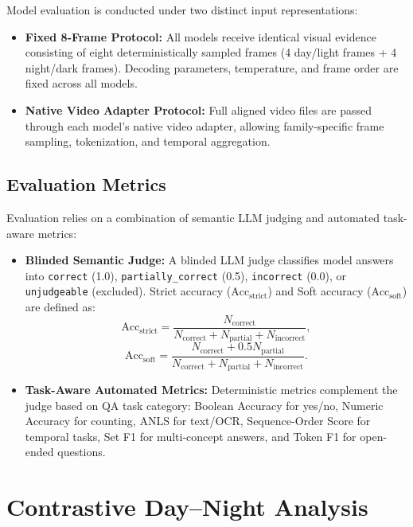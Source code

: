 Model evaluation is conducted under two distinct input representations:
\begin{itemize}
    \item \textbf{Fixed 8-Frame Protocol:} All models receive identical visual evidence consisting of eight deterministically sampled frames (4 day/light frames + 4 night/dark frames). Decoding parameters, temperature, and frame order are fixed across all models.
    \item \textbf{Native Video Adapter Protocol:} Full aligned video files are passed through each model's native video adapter, allowing family-specific frame sampling, tokenization, and temporal aggregation.
\end{itemize}

\subsection{Evaluation Metrics}

Evaluation relies on a combination of semantic LLM judging and automated task-aware metrics:
\begin{itemize}
    \item \textbf{Blinded Semantic Judge:} A blinded LLM judge classifies model answers into \texttt{correct} (1.0), \texttt{partially\_correct} (0.5), \texttt{incorrect} (0.0), or \texttt{unjudgeable} (excluded). Strict accuracy ($\mathrm{Acc}_{\mathrm{strict}}$) and Soft accuracy ($\mathrm{Acc}_{\mathrm{soft}}$) are defined as:
          \begin{equation}
              \mathrm{Acc}_{\mathrm{strict}} = \frac{N_{\mathrm{correct}}}{N_{\mathrm{correct}} + N_{\mathrm{partial}} + N_{\mathrm{incorrect}}},
          \end{equation}
          \begin{equation}
              \mathrm{Acc}_{\mathrm{soft}} = \frac{N_{\mathrm{correct}} + 0.5 N_{\mathrm{partial}}}{N_{\mathrm{correct}} + N_{\mathrm{partial}} + N_{\mathrm{incorrect}}}.
          \end{equation}
    \item \textbf{Task-Aware Automated Metrics:} Deterministic metrics complement the judge based on QA task category: Boolean Accuracy for yes/no, Numeric Accuracy for counting, ANLS for text/OCR, Sequence-Order Score for temporal tasks, Set F1 for multi-concept answers, and Token F1 for open-ended questions.
\end{itemize}


\section{Contrastive Day--Night Analysis}
\label{sec:contrastive_day_night}

